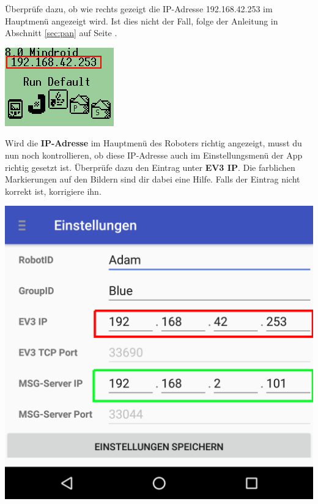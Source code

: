 \documentclass[
	12pt,
	colorbacktitle,
	accentcolor=tud1c,
	draft,
	twoside,
	german
]{tudexercise}
\begin{document}
	
	\begin{enumerate}
	
	\begin{minipage}{.45\textwidth}
	\item Überprüfe dazu, ob wie rechts gezeigt die IP-Adresse 192.168.42.253 im Hauptmenü angezeigt wird. Ist dies nicht der Fall, folge der Anleitung in Abschnitt \ref{sec:pan} auf Seite \pageref{sec:pan}. 
	\end{minipage}
	\hfill	
	\begin{minipage}{.45\textwidth}
	\includegraphics[width=.9\textwidth]{img/ev3_main.png}
	\end{minipage}
	
	\begin{minipage}{.45\textwidth}
	\item Wird die \textbf{IP-Adresse} im Hauptmenü des Roboters richtig angezeigt, musst du nun noch kontrollieren, ob diese IP-Adresse auch im Einstellungsmenü der App richtig gesetzt ist. Überprüfe dazu den Eintrag unter \textbf{EV3 IP}. Die farblichen Markierungen auf den Bildern sind dir dabei eine Hilfe. Falls der Eintrag nicht korrekt ist, korrigiere ihn.
	\end{minipage}	
	\hfill	
	\begin{minipage}{.45\textwidth}
	\includegraphics[width=.9\textwidth]{img/app_settings_short.png}
	\end{minipage}
	

\end{enumerate}
\end{document}
